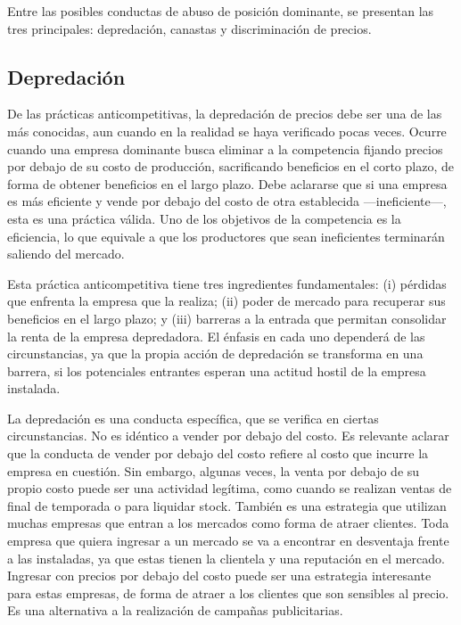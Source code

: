 \documentclass[
  12pt,
  spanish,
]{book}
\begin{document}
Entre las posibles conductas de abuso de posición dominante, se presentan las tres principales: depredación, canastas y discriminación de precios.

\hypertarget{depredaciuxf3n}{%
\subsection{Depredación}\label{depredaciuxf3n}}

De las prácticas anticompetitivas, la depredación de precios debe ser una de las más conocidas, aun cuando en la realidad se haya verificado pocas veces. Ocurre cuando una empresa dominante busca eliminar a la competencia fijando precios por debajo de su costo de producción, sacrificando beneficios en el corto plazo, de forma de obtener beneficios en el largo plazo. Debe aclararse que si una empresa es más eficiente y vende por debajo del costo de otra establecida ---ineficiente---, esta es una práctica válida. Uno de los objetivos de la competencia es la eficiencia, lo que equivale a que los productores que sean ineficientes terminarán saliendo del mercado.

Esta práctica anticompetitiva tiene tres ingredientes fundamentales: (i) pérdidas que enfrenta la empresa que la realiza; (ii) poder de mercado para recuperar sus beneficios en el largo plazo; y (iii) barreras a la entrada que permitan consolidar la renta de la empresa depredadora. El énfasis en cada uno dependerá de las circunstancias, ya que la propia acción de depredación se transforma en una barrera, si los potenciales entrantes esperan una actitud hostil de la empresa instalada.

La depredación es una conducta específica, que se verifica en ciertas circunstancias. No es idéntico a vender por debajo del costo. Es relevante aclarar que la conducta de vender por debajo del costo refiere al costo que incurre la empresa en cuestión. Sin embargo, algunas veces, la venta por debajo de su propio costo puede ser una actividad legítima, como cuando se realizan ventas de final de temporada o para liquidar stock. También es una estrategia que utilizan muchas empresas que entran a los mercados como forma de atraer clientes. Toda empresa que quiera ingresar a un mercado se va a encontrar en desventaja frente a las instaladas, ya que estas tienen la clientela y una reputación en el mercado. Ingresar con precios por debajo del costo puede ser una estrategia interesante para estas empresas, de forma de atraer a los clientes que son sensibles al precio. Es una alternativa a la realización de campañas publicitarias.
\end{document}
